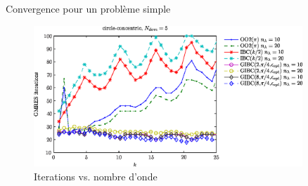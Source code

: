 \documentclass[
mode=present,    %
paper=a4paper,   %
orient=landscape,
display=slides,   %
size=10pt,
style=romain   %
]{powerdot}
\begin{document}
\begin{slide}[toc=]{Convergence pour un problème simple}

\begin{figure}
  \begin{center}
    \includegraphics[width=0.9\textwidth]{circle-concentric-iter-vs-k-final}
  \end{center}  
  \caption{Iterations vs. nombre d'onde\label{concentric2}}
  \label{circle-concentric}
\end{figure}

\end{slide}
\end{document}
